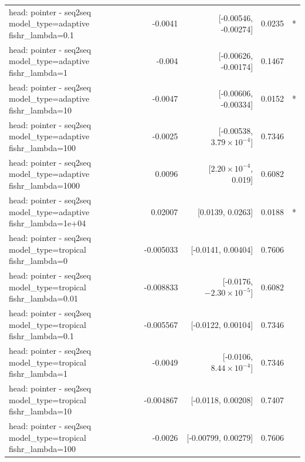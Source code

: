 \documentclass[10pt]{article}
\makeatletter
\newcommand{\stackcell}[1]{\begin{tabular}[t]{@{}l@{}}#1\end{tabular}}
\makeatother
\begin{document}
{\begin{longtable}{lrrrl}
\stackcell{head: pointer - seq2seq\\\footnotesize model\_type=adaptive fishr\_lambda=0.1 } & -0.0041 & [-0.00546, -0.00274] & 0.0235 & *\\
\stackcell{head: pointer - seq2seq\\\footnotesize model\_type=adaptive fishr\_lambda=1 } & -0.004 & [-0.00626, -0.00174] & 0.1467 & \\
\stackcell{head: pointer - seq2seq\\\footnotesize model\_type=adaptive fishr\_lambda=10 } & -0.0047 & [-0.00606, -0.00334] & 0.0152 & *\\
\stackcell{head: pointer - seq2seq\\\footnotesize model\_type=adaptive fishr\_lambda=100 } & -0.0025 & [-0.00538, $3.79\times10^{-4}$] & 0.7346 & \\
\stackcell{head: pointer - seq2seq\\\footnotesize model\_type=adaptive fishr\_lambda=1000 } & 0.0096 & [$2.20\times10^{-4}$, 0.019] & 0.6082 & \\
\stackcell{head: pointer - seq2seq\\\footnotesize model\_type=adaptive fishr\_lambda=1e+04 } & 0.02007 & [0.0139, 0.0263] & 0.0188 & *\\
\stackcell{head: pointer - seq2seq\\\footnotesize model\_type=tropical fishr\_lambda=0 } & -0.005033 & [-0.0141, 0.00404] & 0.7606 & \\
\stackcell{head: pointer - seq2seq\\\footnotesize model\_type=tropical fishr\_lambda=0.01 } & -0.008833 & [-0.0176, $-2.30\times10^{-5}$] & 0.6082 & \\
\stackcell{head: pointer - seq2seq\\\footnotesize model\_type=tropical fishr\_lambda=0.1 } & -0.005567 & [-0.0122, 0.00104] & 0.7346 & \\
\stackcell{head: pointer - seq2seq\\\footnotesize model\_type=tropical fishr\_lambda=1 } & -0.0049 & [-0.0106, $8.44\times10^{-4}$] & 0.7346 & \\
\stackcell{head: pointer - seq2seq\\\footnotesize model\_type=tropical fishr\_lambda=10 } & -0.004867 & [-0.0118, 0.00208] & 0.7407 & \\
\stackcell{head: pointer - seq2seq\\\footnotesize model\_type=tropical fishr\_lambda=100 } & -0.0026 & [-0.00799, 0.00279] & 0.7606 & \\

\end{longtable}}
\end{document}
